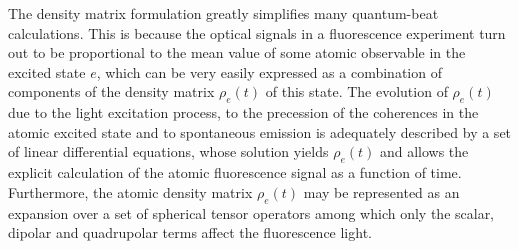 \documentclass[11pt]{article}
\begin{document}
The density matrix formulation greatly simplifies many quantum-beat calculations. This is because the optical signals in a fluorescence experiment turn out to be proportional to the mean value of some atomic observable in the excited state $e$, which can be very easily expressed as a combination of components of the density matrix $\rho_e(t)$ of this state. The evolution of $\rho_e(t)$ due to the light excitation process, to the precession of the coherences
in the atomic excited state and to spontaneous emission is adequately described by a set of linear differential equations, whose solution yields $\rho_e(t)$ and allows the explicit calculation of the atomic fluorescence signal as a function of time. Furthermore, the atomic density matrix $\rho_e(t)$ may be represented as an expansion over a set of spherical tensor operators
among which only the scalar, dipolar and quadrupolar terms affect the fluorescence light.  
\end{document}

